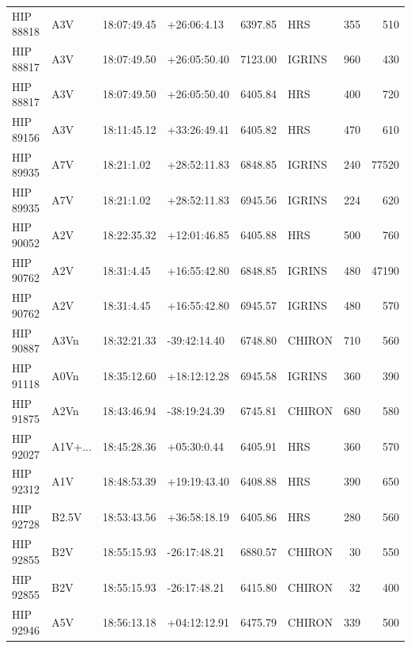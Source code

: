 \documentclass{emulateapj}
\begin{document}
\begin{longtable*}{|l|lllrlrr|}
   HIP 88818 &            A3V &    18:07:49.45 &    +26:06:4.13 &  6397.85 &        HRS &      355 &     510 \\
   HIP 88817 &            A3V &    18:07:49.50 &   +26:05:50.40 &  7123.00 &     IGRINS &      960 &     430 \\
   HIP 88817 &            A3V &    18:07:49.50 &   +26:05:50.40 &  6405.84 &        HRS &      400 &     720 \\
   HIP 89156 &            A3V &    18:11:45.12 &   +33:26:49.41 &  6405.82 &        HRS &      470 &     610 \\
   HIP 89935 &            A7V &     18:21:1.02 &   +28:52:11.83 &  6848.85 &     IGRINS &      240 &   77520 \\
   HIP 89935 &            A7V &     18:21:1.02 &   +28:52:11.83 &  6945.56 &     IGRINS &      224 &     620 \\
   HIP 90052 &            A2V &    18:22:35.32 &   +12:01:46.85 &  6405.88 &        HRS &      500 &     760 \\
   HIP 90762 &            A2V &     18:31:4.45 &   +16:55:42.80 &  6848.85 &     IGRINS &      480 &   47190 \\
   HIP 90762 &            A2V &     18:31:4.45 &   +16:55:42.80 &  6945.57 &     IGRINS &      480 &     570 \\
   HIP 90887 &           A3Vn &    18:32:21.33 &   -39:42:14.40 &  6748.80 &     CHIRON &      710 &     560 \\
   HIP 91118 &           A0Vn &    18:35:12.60 &   +18:12:12.28 &  6945.58 &     IGRINS &      360 &     390 \\
   HIP 91875 &           A2Vn &    18:43:46.94 &   -38:19:24.39 &  6745.81 &     CHIRON &      680 &     580 \\
   HIP 92027 &        A1V+... &    18:45:28.36 &    +05:30:0.44 &  6405.91 &        HRS &      360 &     570 \\
   HIP 92312 &            A1V &    18:48:53.39 &   +19:19:43.40 &  6408.88 &        HRS &      390 &     650 \\
   HIP 92728 &          B2.5V &    18:53:43.56 &   +36:58:18.19 &  6405.86 &        HRS &      280 &     560 \\
   HIP 92855 &            B2V &    18:55:15.93 &   -26:17:48.21 &  6880.57 &     CHIRON &       30 &     550 \\
   HIP 92855 &            B2V &    18:55:15.93 &   -26:17:48.21 &  6415.80 &     CHIRON &       32 &     400 \\
   HIP 92946 &            A5V &    18:56:13.18 &   +04:12:12.91 &  6475.79 &     CHIRON &      339 &     500 \\

\end{longtable*}
\end{document}
